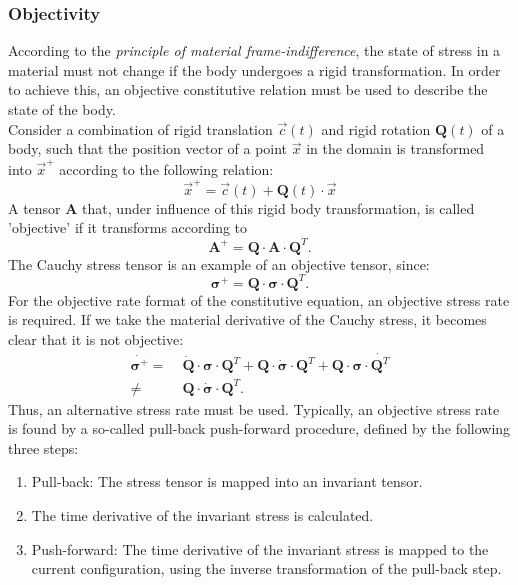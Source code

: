 \subsubsection{Objectivity}
According to the \textit{principle of material frame-indifference}, the state of stress in a material must not change if the body undergoes a rigid transformation. In order to achieve this, an objective constitutive relation must be used to describe the state of the body.\\
\newline
Consider a combination of rigid translation $\vec{c}(t)$ and rigid rotation $\boldsymbol{Q}(t)$ of a body, such that the position vector of a point $\vec{x}$ in the domain is transformed into $\vec{x}^+$ according to the following relation:
\begin{equation}\label{Ch3_rigidmotion}
    \vec{x}^+ = \vec{c}(t)+\boldsymbol{Q}(t)\cdot\vec{x}
\end{equation}
A tensor $\boldsymbol{A}$ that, under influence of this rigid body transformation, is called 'objective' if it transforms according to 
\begin{equation}
    \boldsymbol{A}^+=\boldsymbol{Q}\cdot\boldsymbol{A}\cdot\boldsymbol{Q}^T.
\end{equation}
The Cauchy stress tensor is an example of an objective tensor, since:
\begin{equation}
    \boldsymbol{\sigma}^+=\boldsymbol{Q}\cdot\boldsymbol{\sigma}\cdot\boldsymbol{Q}^T.
\end{equation}
For the objective rate format of the constitutive equation, an objective stress rate is required. If we take the material derivative of the Cauchy stress, it becomes clear that it is not objective:
\begin{equation}
\begin{split}
    \dot{\boldsymbol{\sigma}^+}=& \;\dot{\boldsymbol{Q}}\cdot\boldsymbol{\sigma}\cdot\boldsymbol{Q}^T+\boldsymbol{Q}\cdot\dot{\boldsymbol{\sigma}}\cdot\boldsymbol{Q}^T+\boldsymbol{Q}\cdot\boldsymbol{\sigma}\cdot\dot{\boldsymbol{Q}^T}\\
    \neq& \; \boldsymbol{Q}\cdot\dot{\boldsymbol{\sigma}}\cdot\boldsymbol{Q}^T.
\end{split}
\end{equation}
Thus, an alternative stress rate must be used. Typically, an objective stress rate is found by a so-called pull-back push-forward procedure, defined by the following three steps:
\begin{enumerate}
    \item Pull-back: The stress tensor is mapped into an invariant tensor.
    \item The time derivative of the invariant stress is calculated.
    \item Push-forward: The time derivative of the invariant stress is mapped to the current configuration, using the inverse transformation of the pull-back step.
\end{enumerate}
